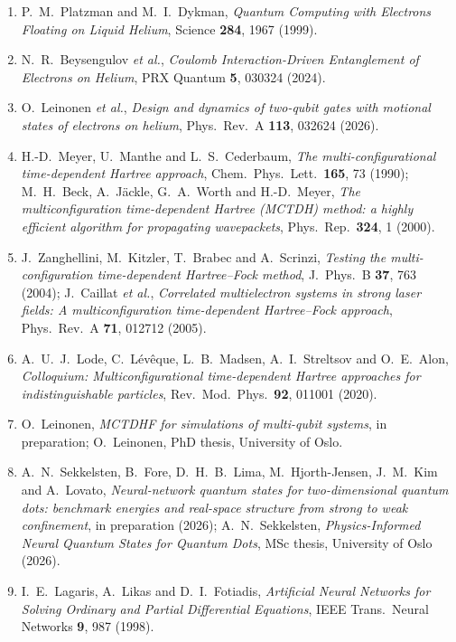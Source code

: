 \documentclass[12pt,a4paper]{article}
\begin{document}
\begin{enumerate}
    \item P.~M.~Platzman and M.~I.~Dykman, \textit{Quantum Computing with Electrons Floating on Liquid Helium}, Science \textbf{284}, 1967 (1999).
    \item N.~R.~Beysengulov \textit{et al.}, \textit{Coulomb Interaction-Driven Entanglement of Electrons on Helium}, PRX Quantum \textbf{5}, 030324 (2024).
    \item O.~Leinonen \textit{et al.}, \textit{Design and dynamics of two-qubit gates with motional states of electrons on helium}, Phys.\ Rev.\ A \textbf{113}, 032624 (2026).
    \item H.-D.~Meyer, U.~Manthe and L.~S.~Cederbaum, \textit{The multi-configurational time-dependent Hartree approach}, Chem.\ Phys.\ Lett.\ \textbf{165}, 73 (1990); M.~H.~Beck, A.~J\"ackle, G.~A.~Worth and H.-D.~Meyer, \textit{The multiconfiguration time-dependent Hartree (MCTDH) method: a highly efficient algorithm for propagating wavepackets}, Phys.\ Rep.\ \textbf{324}, 1 (2000).
    \item J.~Zanghellini, M.~Kitzler, T.~Brabec and A.~Scrinzi, \textit{Testing the multi-configuration time-dependent Hartree--Fock method}, J.\ Phys.\ B \textbf{37}, 763 (2004); J.~Caillat \textit{et al.}, \textit{Correlated multielectron systems in strong laser fields: A multiconfiguration time-dependent Hartree--Fock approach}, Phys.\ Rev.\ A \textbf{71}, 012712 (2005).
    \item A.~U.~J.~Lode, C.~L\'ev\^eque, L.~B.~Madsen, A.~I.~Streltsov and O.~E.~Alon, \textit{Colloquium: Multiconfigurational time-dependent Hartree approaches for indistinguishable particles}, Rev.\ Mod.\ Phys.\ \textbf{92}, 011001 (2020).
    \item O.~Leinonen, \textit{MCTDHF for simulations of multi-qubit systems}, in preparation; O.~Leinonen, PhD thesis, University of Oslo.
    \item A.~N.~Sekkelsten, B.~Fore, D.~H.~B.~Lima, M.~Hjorth-Jensen, J.~M.~Kim and A.~Lovato, \textit{Neural-network quantum states for two-dimensional quantum dots: benchmark energies and real-space structure from strong to weak confinement}, in preparation (2026); A.~N.~Sekkelsten, \textit{Physics-Informed Neural Quantum States for Quantum Dots}, MSc thesis, University of Oslo (2026).
    \item I.~E.~Lagaris, A.~Likas and D.~I.~Fotiadis, \textit{Artificial Neural Networks for Solving Ordinary and Partial Differential Equations}, IEEE Trans.\ Neural Networks \textbf{9}, 987 (1998).

\end{enumerate}
\end{document}

